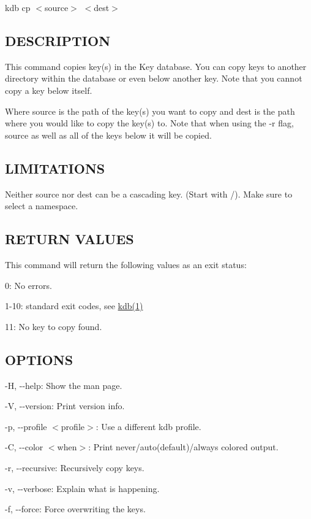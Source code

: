 {\ttfamily kdb cp $<$source$>$ $<$dest$>$}

\subsection*{D\+E\+S\+C\+R\+I\+P\+T\+I\+ON}

This command copies key(s) in the Key database. You can copy keys to another directory within the database or even below another key. Note that you cannot copy a key below itself.

Where {\ttfamily source} is the path of the key(s) you want to copy and {\ttfamily dest} is the path where you would like to copy the key(s) to. Note that when using the {\ttfamily -\/r} flag, {\ttfamily source} as well as all of the keys below it will be copied.

\subsection*{L\+I\+M\+I\+T\+A\+T\+I\+O\+NS}

Neither {\ttfamily source} nor {\ttfamily dest} can be a cascading key. (Start with {\ttfamily /}). Make sure to select a namespace.

\subsection*{R\+E\+T\+U\+RN V\+A\+L\+U\+ES}

This command will return the following values as an exit status\+:


\begin{DoxyItemize}
\item 0\+: No errors.
\item 1-\/10\+: standard exit codes, see \hyperlink{md_doc_help_kdb_doc_help_kdb_md}{kdb(1)}
\item 11\+: No key to copy found.
\end{DoxyItemize}

\subsection*{O\+P\+T\+I\+O\+NS}


\begin{DoxyItemize}
\item {\ttfamily -\/H}, {\ttfamily -\/-\/help}\+: Show the man page.
\item {\ttfamily -\/V}, {\ttfamily -\/-\/version}\+: Print version info.
\item {\ttfamily -\/p}, {\ttfamily -\/-\/profile $<$profile$>$}\+: Use a different kdb profile.
\item {\ttfamily -\/C}, {\ttfamily -\/-\/color $<$when$>$}\+: Print never/auto(default)/always colored output.
\item {\ttfamily -\/r}, {\ttfamily -\/-\/recursive}\+: Recursively copy keys.
\item {\ttfamily -\/v}, {\ttfamily -\/-\/verbose}\+: Explain what is happening.
\item {\ttfamily -\/f}, {\ttfamily -\/-\/force}\+: Force overwriting the keys.
\end{DoxyItemize}

